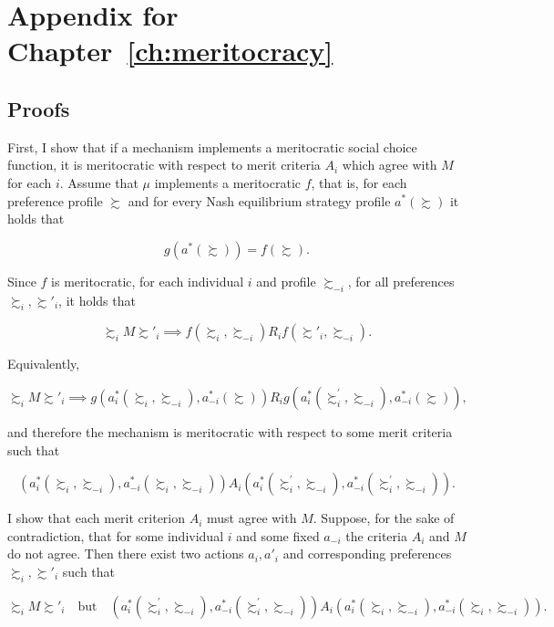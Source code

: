 \chapter{Appendix for Chapter \ref{ch:meritocracy}}
\label{app:meritocracy}

\section{Proofs}\label{sec:proofsmeritocracy}

\begin{implproof}
	First, I show that if a mechanism implements a meritocratic social choice function, it is meritocratic with respect to merit criteria \( A_i \) which agree with \( M \) for each \( i \). Assume that \( \mu \) implements a meritocratic \( f \), that is, for each preference profile \( \succsim \) and for every Nash equilibrium strategy profile \( a^{*} ( \succsim ) \) it holds that

	\[
		g ( a^{*} ( \succsim ) ) = f ( \succsim ).
	\]

	Since \( f \) is meritocratic, for each individual \( i \) and profile \( \succsim_{-i} \), for all preferences \( \succsim_i, \succsim'_i \), it holds that

	\[
		\succsim_i M \succsim'_i \implies f (\succsim_i, \succsim_{-i}) R_i f (\succsim'_i, \succsim_{-i} ).
	\]

	Equivalently,

	\[
		\succsim_i M \succsim'_i \implies g ( a_i^*(\succsim_i, \succsim_{-i}), a_{-i}^*(\succsim) ) R_i g ( a_i^*(\succsim_i^{\prime}, \succsim_{-i}), a_{-i}^*(\succsim) ),
	\]

	and therefore the mechanism is meritocratic with respect to some merit criteria such that

	\[ ( a_i^*(\succsim_i, \succsim_{-i}), a_{-i}^*(\succsim_i, \succsim_{-i}) ) A_i ( a_i^*(\succsim_i^{\prime}, \succsim_{-i}), a_{-i}^*(\succsim_i^{\prime}, \succsim_{-i}) ) .\]

	I show that each merit criterion \( A_i \) must agree with \( M \). Suppose, for the sake of contradiction, that for some individual \( i \) and some fixed \( a_{-i} \) the criteria \( A_i \) and \( M \) do not agree. Then there exist two actions \( a_i, a'_i \) and corresponding preferences \( \succsim_i, \succsim'_i \) such that

	\[
		\succsim_i M \succsim'_i
		\quad \text{but} \quad
		( a_i^*(\succsim_i^{\prime}, \succsim_{-i}), a_{-i}^*(\succsim_i^{\prime}, \succsim_{-i}) ) A_i ( a_i^*(\succsim_i, \succsim_{-i}), a_{-i}^*(\succsim_i, \succsim_{-i}) ) .
	\]


\end{implproof}
